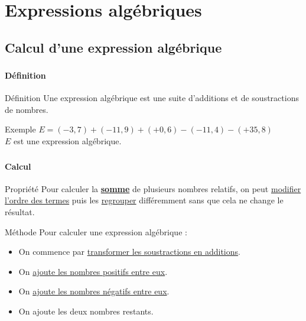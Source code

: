 \documentclass{beamer}
\begin{document}
\section{Expressions algébriques}

\subsection{Calcul d'une expression algébrique}

\begin{frame}
	\frametitle{} %
	\framesubtitle{Définition}	
	
	\begin{block}{Définition}
		Une expression algébrique est une suite d'additions et de soustractions de nombres.
	\end{block}
	
	\begin{exampleblock}{Exemple}
		$E = (-3,7) + (-11,9) + (+0,6) - (-11,4) - (+35,8)$\\
		
		$E$ est une expression algébrique.
	\end{exampleblock}
\end{frame}

\begin{frame}
	\frametitle{} %
	\framesubtitle{Calcul }
	
	\begin{block}{Propriété}
		Pour calculer la \textbf{\underline{somme}} de plusieurs nombres relatifs, on peut \underline{modifier l'ordre des termes} puis les \underline{regrouper} différemment sans que cela ne change le résultat.\pause
	\end{block}	
	
	\begin{block}{Méthode}
		Pour calculer une expression algébrique :
		\begin{itemize}
			\item On commence par \underline{transformer les soustractions en additions}.
			\item On \underline{ajoute les nombres positifs entre eux}. 
			\item On \underline{ajoute les nombres négatifs entre eux}.
			\item On ajoute les deux nombres restants.
		\end{itemize}
	\end{block}
\end{frame}
\end{document}
